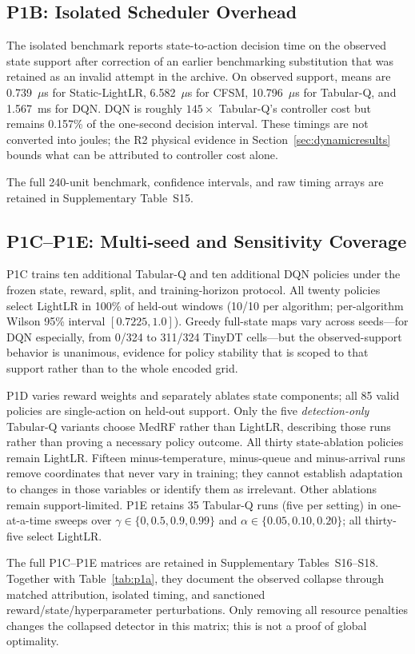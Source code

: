 \subsection{P1B: Isolated Scheduler Overhead}
The isolated benchmark reports state-to-action decision time on the observed state support after correction of an earlier benchmarking substitution that was retained as an invalid attempt in the archive. On observed support, means are 0.739~$\mu$s for Static-LightLR, 6.582~$\mu$s for CFSM, 10.796~$\mu$s for Tabular-Q, and 1.567~ms for DQN. DQN is roughly $145\times$ Tabular-Q's controller cost but remains 0.157\% of the one-second decision interval. These timings are not converted into joules; the R2 physical evidence in Section~\ref{sec:dynamicresults} bounds what can be attributed to controller cost alone.

The full 240-unit benchmark, confidence intervals, and raw timing arrays are retained in Supplementary Table~S15.

\subsection{P1C--P1E: Multi-seed and Sensitivity Coverage}
P1C trains ten additional Tabular-Q and ten additional DQN policies under the frozen state, reward, split, and training-horizon protocol. All twenty policies select LightLR in 100\% of held-out windows (10/10 per algorithm; per-algorithm Wilson 95\% interval $[0.7225, 1.0]$). Greedy full-state maps vary across seeds---for DQN especially, from 0/324 to 311/324 TinyDT cells---but the observed-support behavior is unanimous, evidence for policy stability that is scoped to that support rather than to the whole encoded grid.

P1D varies reward weights and separately ablates state components; all 85 valid policies are single-action on held-out support. Only the five \emph{detection-only} Tabular-Q variants choose MedRF rather than LightLR, describing those runs rather than proving a necessary policy outcome. All thirty state-ablation policies remain LightLR. Fifteen minus-temperature, minus-queue and minus-arrival runs remove coordinates that never vary in training; they cannot establish adaptation to changes in those variables or identify them as irrelevant. Other ablations remain support-limited. P1E retains 35 Tabular-Q runs (five per setting) in one-at-a-time sweeps over $\gamma\in\{0,0.5,0.9,0.99\}$ and $\alpha\in\{0.05,0.10,0.20\}$; all thirty-five select LightLR.

The full P1C--P1E matrices are retained in Supplementary Tables~S16--S18. Together with Table~\ref{tab:p1a}, they document the observed collapse through matched attribution, isolated timing, and sanctioned reward/state/hyperparameter perturbations. Only removing all resource penalties changes the collapsed detector in this matrix; this is not a proof of global optimality.
